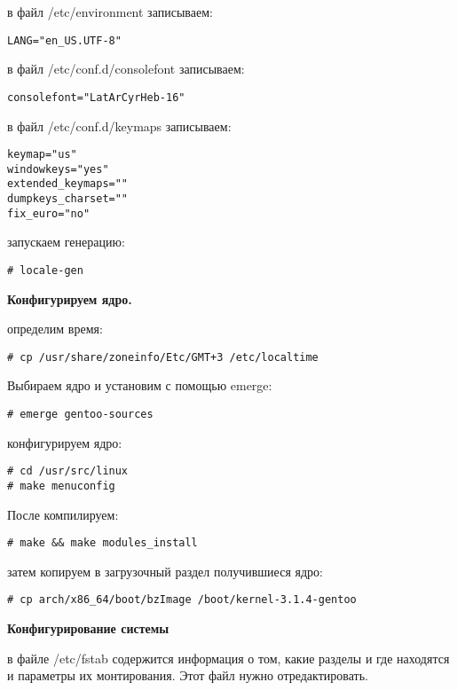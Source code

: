 \documentclass[10pt, a4paper]{article}
\begin{document}
в файл /etc/environment записываем:

\begin{verbatim}
LANG="en_US.UTF-8"
\end{verbatim}

в файл /etc/conf.d/consolefont записываем:

\begin{verbatim}
consolefont="LatArCyrHeb-16"
\end{verbatim}

в файл /etc/conf.d/keymaps записываем:
\begin{verbatim}
keymap="us"
windowkeys="yes"
extended_keymaps=""
dumpkeys_charset=""
fix_euro="no"
\end{verbatim}

запускаем генерацию:

\begin{verbatim}
# locale-gen
\end{verbatim}

{\bf Конфигурируем ядро.}

определим время:

\begin{verbatim}
# cp /usr/share/zoneinfo/Etc/GMT+3 /etc/localtime
\end{verbatim}

Выбираем ядро и установим с помощью emerge:

\begin{verbatim}
# emerge gentoo-sources
\end{verbatim}

конфигурируем ядро:

\begin{verbatim}
# cd /usr/src/linux
# make menuconfig
\end{verbatim}

После компилируем:

\begin{verbatim}
# make && make modules_install
\end{verbatim}

затем копируем в загрузочный раздел получившиеся ядро:

\begin{verbatim}
# cp arch/x86_64/boot/bzImage /boot/kernel-3.1.4-gentoo
\end{verbatim}

{\bf Конфигурирование системы}

в файле /etc/fstab  содержится информация о том, какие разделы и где находятся и параметры их монтирования. Этот файл нужно отредактировать.
\end{document}
